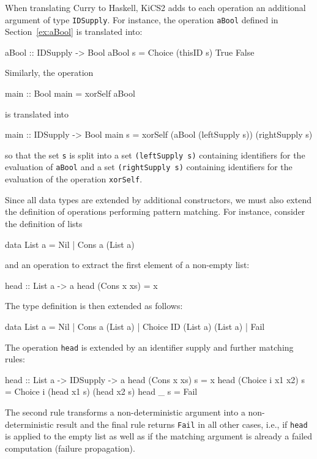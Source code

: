 \documentclass{llncs}
\newcommand{\code}[1]{\mbox{\small\texttt{#1}}}
\begin{document}
When translating Curry to Haskell, KiCS2 adds to each operation
an additional argument of type \code{IDSupply}.
For instance, the operation \code{aBool}
defined in Section~\ref{ex:aBool} is translated into:
\begin{haskell}
  aBool :: IDSupply -> Bool
  aBool s = Choice (thisID s) True False
\end{haskell}
Similarly, the operation
\begin{curry}
  main :: Bool
  main = xorSelf aBool
\end{curry}
is translated into
\begin{haskell}
  main :: IDSupply -> Bool
  main s = xorSelf (aBool (leftSupply s)) (rightSupply s)
\end{haskell}
so that the set \code{s} is split into a set \code{(leftSupply s)}
containing identifiers for the evaluation of \code{aBool}
and a set \code{(rightSupply s)} containing identifiers
for the evaluation of the operation \code{xorSelf}.

Since all data types are extended by additional constructors,
we must also extend the definition of operations performing
pattern matching. For instance, consider the definition of lists
\begin{curry}
  data List a = Nil | Cons a (List a)
\end{curry}
and an operation to extract the first element of a non-empty list:
\begin{curry}
  head :: List a -> a
  head (Cons x xs) = x
\end{curry}
The type definition is then extended as follows:
\begin{haskell}
  data List a = Nil | Cons a (List a) | Choice ID (List a) (List a) | Fail
\end{haskell}
The operation \code{head} is extended by an identifier supply
and further matching rules:
\begin{haskell}
  head :: List a -> IDSupply -> a
  head (Cons x xs)      s = x
  head (Choice i x1 x2) s = Choice i (head x1 s) (head x2 s)
  head _                s = Fail
\end{haskell}
The second rule transforms a non-deterministic argument
into a non-deterministic result and
the final rule returns \code{Fail} in all other cases,
i.e., if \code{head} is
applied to the empty list as well as if the matching argument
is already a failed computation (failure propagation).
\end{document}
